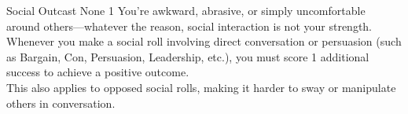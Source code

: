 \CreateFlaw
  {Social Outcast} %
  {None} %
  {1} %
  {You're awkward, abrasive, or simply uncomfortable around others—whatever the reason, social interaction is not your strength.\\
Whenever you make a social roll involving direct conversation or persuasion (such as Bargain, Con, Persuasion, Leadership, etc.), you must score 1 additional success to achieve a positive outcome.\\
This also applies to opposed social rolls, making it harder to sway or manipulate others in  conversation.} %